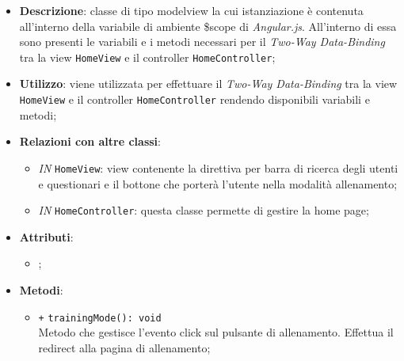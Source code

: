 	\begin{itemize}
		\item \textbf{Descrizione}: classe di tipo modelview la cui istanziazione è contenuta all'interno della variabile di ambiente \$scope di \textit{Angular.js}. All'interno di essa sono presenti le variabili e i metodi necessari per il \textit{Two-Way Data-Binding} tra la view \texttt{HomeView} e il controller \texttt{HomeController};
		\item \textbf{Utilizzo}: viene utilizzata per effettuare il \textit{Two-Way Data-Binding} tra la view \texttt{HomeView} e il controller \texttt{HomeController} rendendo disponibili variabili e metodi;
		\item \textbf{Relazioni con altre classi}: 
		\begin{itemize}
			\item \textit{IN} \texttt{HomeView}: view contenente la direttiva per barra di ricerca degli utenti e questionari e il bottone che porterà l’utente nella modalità allenamento; 
			\item \textit{IN} \texttt{HomeController}: questa classe permette di gestire la home page;
		\end{itemize}
		\item \textbf{Attributi}: 
		\begin{itemize}
			\item ;
		\end{itemize}
		\item \textbf{Metodi}: 
		\begin{itemize}
			\item \texttt{+} \texttt{trainingMode(): void} \\
			Metodo che gestisce l’evento click sul pulsante di allenamento. Effettua il redirect alla pagina di allenamento;
		\end{itemize}
	\end{itemize}
	
	